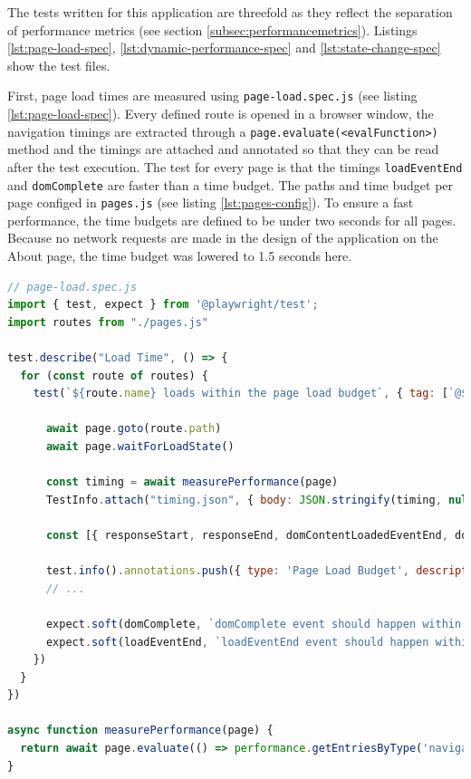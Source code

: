 \documentclass[a4paper, 10pt]{article}
\begin{document}
The tests written for this application are threefold as they reflect the separation of performance metrics (see section \ref{subsec:performancemetrics}).
Listings \ref{lst:page-load-spec}, \ref{lst:dynamic-performance-spec} and \ref{lst:state-change-spec} show the test files.

First, page load times are measured using \verb|page-load.spec.js| (see listing \ref{lst:page-load-spec}).
Every defined route is opened in a browser window, the navigation timings are extracted through a \verb|page.evaluate(<evalFunction>)| method and the timings are attached and annotated so that they can be read after the test execution.
The test for every page is that the timings \verb|loadEventEnd| and \verb|domComplete| are faster than a time budget.
The paths and time budget per page configed in \verb|pages.js| (see listing \ref{lst:pages-config}).
To ensure a fast performance, the time budgets are defined to be under two seconds for all pages.
Because no network requests are made in the design of the application on the About page, the time budget was lowered to 1.5 seconds here.

\begin{lstlisting}[caption={Test file for page load times}, label={lst:page-load-spec}, language=JavaScript]
// page-load.spec.js
import { test, expect } from '@playwright/test';
import routes from "./pages.js"

test.describe("Load Time", () => {
  for (const route of routes) {
    test(`${route.name} loads within the page load budget`, { tag: [`@${route.name}`, '@pageLoad'] }, async ({ page }, TestInfo) => {

      await page.goto(route.path)
      await page.waitForLoadState()

      const timing = await measurePerformance(page)
      TestInfo.attach("timing.json", { body: JSON.stringify(timing, null, 2), contentType: "application/json" })

      const [{ responseStart, responseEnd, domContentLoadedEventEnd, domComplete, loadEventEnd }] = timing;

      test.info().annotations.push({ type: 'Page Load Budget', description: `The time budget for this page was ${route.pageLoadBudgetMs}ms` });
      // ...

      expect.soft(domComplete, `domComplete event should happen within ${route.pageLoadBudgetMs} ms`).toBeLessThanOrEqual(route.pageLoadBudgetMs)
      expect.soft(loadEventEnd, `loadEventEnd event should happen within ${route.pageLoadBudgetMs} ms`).toBeLessThanOrEqual(route.pageLoadBudgetMs)
    })
  }
})

async function measurePerformance(page) {
  return await page.evaluate(() => performance.getEntriesByType('navigation'));
}

\end{lstlisting}
\end{document}
